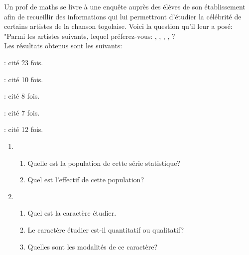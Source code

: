 \documentclass[12pt,a4paper]{report}
\begin{document}
\begin{exo}
Un prof de maths se livre à une enquête auprès des élèves de son établissement afin de recueillir des informations qui lui permettront d'étudier la célébrité de certains artistes de la chanson togolaise. Voici la question qu'il leur a posé: "Parmi les artistes suivants, lequel préferez-vous: \A, \B, \C, \D, \E?\\
Les résultats obtenus sont les suivants:

\begin{remslist}
\item \A : cité 23 fois.
\item \B : cité 10 fois.
\item \C : cité 8 fois.
\item \D : cité 7 fois.
\item \E : cité 12 fois.
\end{remslist}

\begin{enumerate}
\item \begin{enumerate}
\item Quelle est la population de cette série statistique?
\item Quel est l'effectif de cette population?
\end{enumerate}
\item \begin{enumerate}
\item Quel est la caractère étudier.
\item Le caractère étudier est-il quantitatif ou qualitatif?
\item Quelles sont les modalités de ce caractère?
\end{enumerate}
\end{enumerate}
\end{exo}
\end{document}
